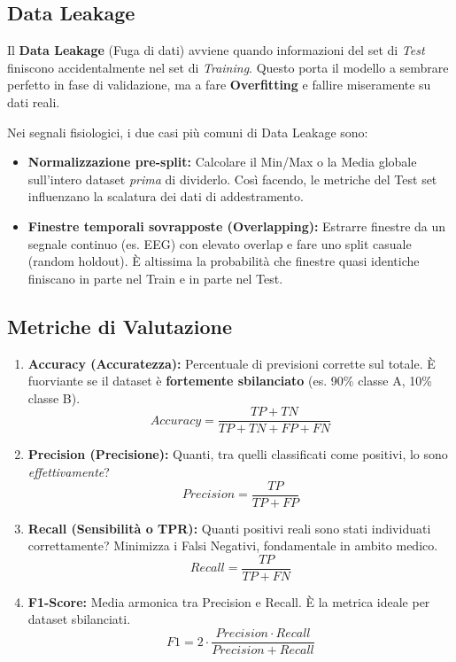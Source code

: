 \subsection{Data Leakage}
Il \textbf{Data Leakage} (Fuga di dati) avviene quando informazioni del set di \textit{Test} finiscono accidentalmente nel set di \textit{Training}. Questo porta il modello a sembrare perfetto in fase di validazione, ma a fare \textbf{Overfitting} e fallire miseramente su dati reali.

Nei segnali fisiologici, i due casi più comuni di Data Leakage sono:
\begin{itemize}
    \item \textbf{Normalizzazione pre-split:} Calcolare il Min/Max o la Media globale sull'intero dataset \textit{prima} di dividerlo. Così facendo, le metriche del Test set influenzano la scalatura dei dati di addestramento.
    \item \textbf{Finestre temporali sovrapposte (Overlapping):} Estrarre finestre da un segnale continuo (es. EEG) con elevato overlap e fare uno split casuale (random holdout). È altissima la probabilità che finestre quasi identiche finiscano in parte nel Train e in parte nel Test.
\end{itemize}

\subsection{Metriche di Valutazione}

\begin{enumerate}
    \item \textbf{Accuracy (Accuratezza):} Percentuale di previsioni corrette sul totale.
    È fuorviante se il dataset è \textbf{fortemente sbilanciato} (es. 90\% classe A, 10\% classe B).
    \begin{equation}
        Accuracy = \frac{TP + TN}{TP + TN + FP + FN}
    \end{equation}

    \item \textbf{Precision (Precisione):} Quanti, tra quelli classificati come positivi, lo sono \textit{effettivamente}?
    \begin{equation}
        Precision = \frac{TP}{TP + FP}
    \end{equation}

    \item \textbf{Recall (Sensibilità o TPR):} Quanti positivi reali sono stati individuati correttamente?
    Minimizza i Falsi Negativi, fondamentale in ambito medico.
    \begin{equation}
        Recall = \frac{TP}{TP + FN}
    \end{equation}

    \item \textbf{F1-Score:} Media armonica tra Precision e Recall.
    È la metrica ideale per dataset sbilanciati.
    \begin{equation}
        F1 = 2 \cdot \frac{Precision \cdot Recall}{Precision + Recall}
    \end{equation}
\end{enumerate}


